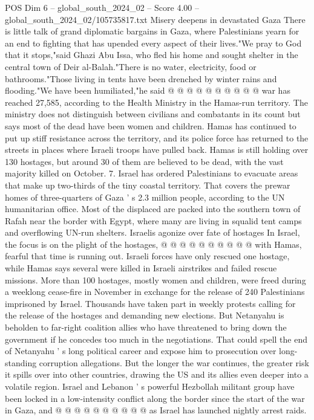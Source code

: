\begin{textsample}{POS Dim 6 – global\_south\_2024\_02 – Score 4.00 – global\_south\_2024\_02/105735817.txt}
Misery deepens in devastated Gaza There is little talk of grand diplomatic bargains in Gaza, where Palestinians yearn for an end to fighting that has upended every aspect of their lives."We pray to God that it stops,"said Ghazi Abu Issa, who fled his home and sought shelter in the central town of Deir al-Balah."There is no water, electricity, food or bathrooms."Those living in tents have been drenched by winter rains and flooding."We have been humiliated,"he said @ @ @ @ @ @ @ @ @ @ war has reached 27,585, according to the Health Ministry in the Hamas-run territory.
The ministry does not distinguish between civilians and combatants in its count but says most of the dead have been women and children.
Hamas has continued to put up stiff resistance across the territory, and its police force has returned to the streets in places where Israeli troops have pulled back.
Hamas is still holding over 130 hostages, but around 30 of them are believed to be dead, with the vast majority killed on October. 7.
Israel has ordered Palestinians to evacuate areas that make up two-thirds of the tiny coastal territory.
That covers the prewar homes of three-quarters of Gaza ' s 2.3 million people, according to the UN humanitarian office.
Most of the displaced are packed into the southern town of Rafah near the border with Egypt, where many are living in squalid tent camps and overflowing UN-run shelters.
Israelis agonize over fate of hostages In Israel, the focus is on the plight of the hostages, @ @ @ @ @ @ @ @ @ @ with Hamas, fearful that time is running out.
Israeli forces have only rescued one hostage, while Hamas says several were killed in Israeli airstrikes and failed rescue missions.
More than 100 hostages, mostly women and children, were freed during a weeklong cease-fire in November in exchange for the release of 240 Palestinians imprisoned by Israel.
Thousands have taken part in weekly protests calling for the release of the hostages and demanding new elections.
But Netanyahu is beholden to far-right coalition allies who have threatened to bring down the government if he concedes too much in the negotiations.
That could spell the end of Netanyahu ' s long political career and expose him to prosecution over long-standing corruption allegations.
But the longer the war continues, the greater risk it spills over into other countries, drawing the US and its allies even deeper into a volatile region.
Israel and Lebanon ' s powerful Hezbollah militant group have been locked in a low-intensity conflict along the border since the start of the war in Gaza, and @ @ @ @ @ @ @ @ @ @ as Israel has launched nightly arrest raids.

\end{textsample}
